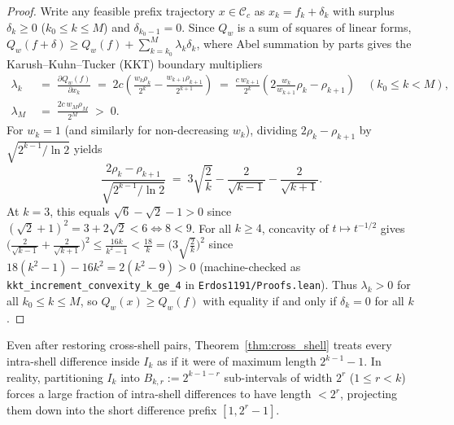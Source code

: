 \documentclass[11pt,reqno]{amsart}
\theoremstyle{definition}
\theoremstyle{remark}
\begin{document}
\begin{proof}
Write any feasible prefix trajectory $x \in \mathcal{C}_c$ as $x_k = f_k + \delta_k$ with surplus $\delta_k \ge 0$ ($k_0 \le k \le M$) and $\delta_{k_0-1} = 0$. Since $Q_w$ is a sum of squares of linear forms, $Q_w(f + \delta) \ge Q_w(f) + \sum_{k=k_0}^M \lambda_k \delta_k$, where Abel summation by parts gives the Karush--Kuhn--Tucker (KKT) boundary multipliers
\[
  \begin{aligned}
    \lambda_k &\;=\; \frac{\partial Q_w(f)}{\partial x_k} \;=\; 2c\left(\frac{w_k \rho_k}{2^k} - \frac{w_{k+1} \rho_{k+1}}{2^{k+1}}\right) \;=\; \frac{c\,w_{k+1}}{2^k}\left(2\frac{w_k}{w_{k+1}}\rho_k - \rho_{k+1}\right) \quad (k_0 \le k < M), \\
    \lambda_M &\;=\; \frac{2c\,w_M \rho_M}{2^M} \;>\; 0.
  \end{aligned}
\]
For $w_k = 1$ (and similarly for non-decreasing $w_k$), dividing $2\rho_k - \rho_{k+1}$ by $\sqrt{2^{k-1}/\ln 2}$ yields
\[
  \frac{2\rho_k - \rho_{k+1}}{\sqrt{2^{k-1}/\ln 2}} \;=\; 3\sqrt{\frac{2}{k}} - \frac{2}{\sqrt{k - 1}} - \frac{2}{\sqrt{k + 1}}.
\]
At $k = 3$, this equals $\sqrt{6} - \sqrt{2} - 1 > 0$ since $(\sqrt{2} + 1)^2 = 3 + 2\sqrt{2} < 6 \iff 8 < 9$. For all $k \ge 4$, concavity of $t \mapsto t^{-1/2}$ gives $\bigl(\frac{2}{\sqrt{k-1}} + \frac{2}{\sqrt{k+1}}\bigr)^2 \le \frac{16 k}{k^2 - 1} < \frac{18}{k} = \bigl(3\sqrt{\frac{2}{k}}\bigr)^2$ since $18(k^2 - 1) - 16 k^2 = 2(k^2 - 9) > 0$ (machine-checked as \texttt{kkt\_increment\_convexity\_k\_ge\_4} in \texttt{Erdos1191/Proofs.lean}). Thus $\lambda_k > 0$ for all $k_0 \le k \le M$, so $Q_w(x) \ge Q_w(f)$ with equality if and only if $\delta_k = 0$ for all $k$.
\end{proof}

Even after restoring cross-shell pairs, Theorem~\ref{thm:cross_shell} treats every intra-shell difference inside $I_k$ as if it were of maximum length $2^{k-1}-1$. In reality, partitioning $I_k$ into $B_{k,r} := 2^{k-1-r}$ sub-intervals of width $2^r$ ($1 \le r < k$) forces a large fraction of intra-shell differences to have length $< 2^r$, projecting them down into the short difference prefix $[1, 2^r - 1]$.
\end{document}
